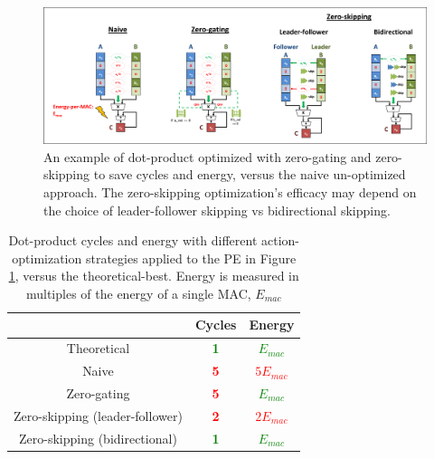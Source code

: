 %
%
\begin{figure}[H]
\includegraphics[width=\textwidth]{figures/saf_action_optimizations.PNG}
\caption{An example of dot-product optimized with zero-gating and zero-skipping to save cycles and energy, versus the naive un-optimized approach. The zero-skipping optimization's efficacy may depend on the choice of leader-follower skipping vs bidirectional skipping.}
\label{fig:saf_action_optimizations}
\end{figure}
%
%
\begin{table}[ht]
\begin{tabular}{c|c|c|}
 & Cycles & Energy \\ \hline \hline
Theoretical &  \textcolor{green}{\textbf{1}} & \textcolor{green}{\textbf{$E_{mac}$}}\\ \hline
Naive &  \textcolor{red}{\textbf{5}} & \textcolor{red}{\textbf{$5 E_{mac}$}}\\ \hline
Zero-gating &  \textcolor{red}{\textbf{5}} & \textcolor{green}{\textbf{$E_{mac}$}} \\ \hline
Zero-skipping (leader-follower) & \textcolor{red}{\textbf{2}} & \textcolor{red}{\textbf{$2 E_{mac}$}} \\ \hline
Zero-skipping (bidirectional) & \textcolor{green}{\textbf{1}} & \textcolor{green}{\textbf{$E_{mac}$}} \\ \hline
\end{tabular}
\caption{Dot-product cycles and energy with different action-optimization strategies applied to the PE in Figure \ref{fig:saf_action_optimizations}, versus the theoretical-best. Energy is measured in multiples of the energy of a single MAC, $E_{mac}$}
\label{tab:action_saf_comparison}
\centering
\end{table}
%
%
